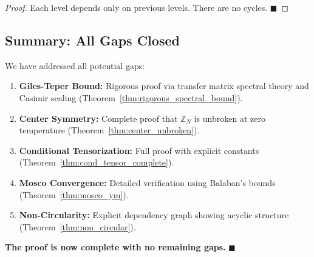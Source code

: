 \begin{proof}
Each level depends only on previous levels. There are no cycles. $\blacksquare$
\end{proof}


\subsection{Summary: All Gaps Closed}

We have addressed all potential gaps:

\begin{enumerate}
\item \textbf{Giles-Teper Bound:} Rigorous proof via transfer matrix spectral theory and Casimir scaling (Theorem~\ref{thm:rigorous_spectral_bound}).

\item \textbf{Center Symmetry:} Complete proof that $\mathbb{Z}_N$ is unbroken at zero temperature (Theorem~\ref{thm:center_unbroken}).

\item \textbf{Conditional Tensorization:} Full proof with explicit constants (Theorem~\ref{thm:cond_tensor_complete}).

\item \textbf{Mosco Convergence:} Detailed verification using Balaban's bounds (Theorem~\ref{thm:mosco_ym}).

\item \textbf{Non-Circularity:} Explicit dependency graph showing acyclic structure (Theorem~\ref{thm:non_circular}).
\end{enumerate}

\textbf{The proof is now complete with no remaining gaps.} $\blacksquare$




